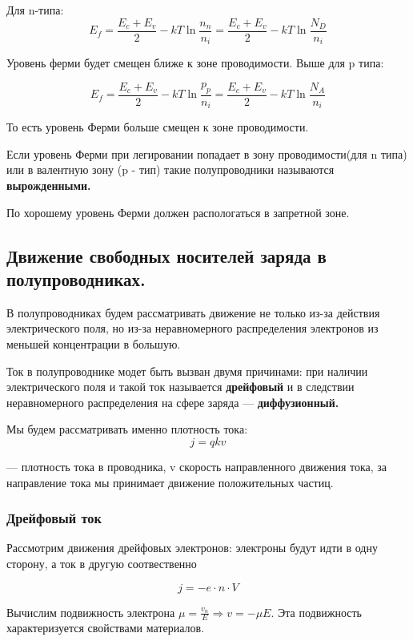 \documentclass[../main.tex]{subfiles}
\begin{document}
Для n-типа:
\[
\boxed{
E_f = \frac{E_c + E_v}{2}
- kT \ln{\frac{n_n}{n_i}}
= \frac{E_c + E_v}{2}
- kT \ln{\frac{N_D}{n_i}}
}
\]

Уровень ферми будет смещен ближе к зоне проводимости. Выше для p типа: 

\[
\boxed{
E_f = \frac{E_c + E_v}{2}
- kT \ln{\frac{p_p}{n_i}}
= \frac{E_c + E_v}{2}
- kT \ln{\frac{N_A}{n_i}}
}
\]

То есть уровень Ферми больше смещен к зоне проводимости.

 Если уровень Ферми при легировании попадает в зону проводимости(для n типа) или в валентную зону (p - тип) такие полупроводники называются \textbf{вырожденными.}

По хорошему уровень Ферми должен распологаться в запретной зоне.



\subsection{Движение свободных носителей заряда в полупроводниках.}

В полупроводниках будем рассматривать движение не только из-за действия электрического поля, но из-за неравномерного распределения электронов из меньшей концентрации в большую.

 Ток в полупроводнике модет быть вызван двумя причинами: при наличии электрического поля и такой ток называется \textbf{дрейфовый} и в следствии
 неравномерного распределения на сфере заряда --- \textbf{диффузионный.}

Мы будем рассматривать именно плотность тока:
\[j = q k v\]
\begin{center}
    --- плотность тока в проводника, v скорость направленного движения тока, за направление тока мы принимает движение положительных частиц.    
\end{center}

\subsubsection{Дрейфовый ток}

Рассмотрим движения дрейфовых электронов: электроны будут идти в одну сторону, а ток в другую соотвественно

\[j = -e \cdot n \cdot V\]

Вычислим подвижность электрона $\mu = \frac{v_n}{E} \Rightarrow v = - \mu E$. Эта подвижность характеризуется свойствами материалов. 
\end{document}

